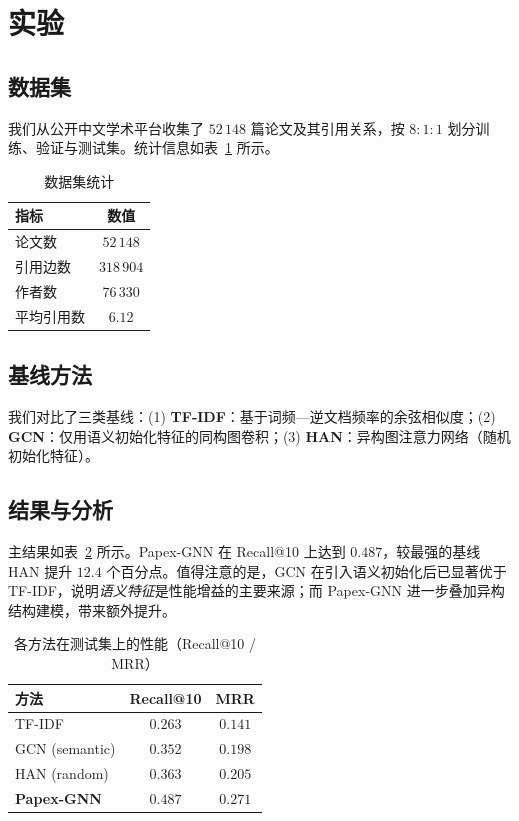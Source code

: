 \section{实验}
\subsection{数据集}
我们从公开中文学术平台收集了 $52\,148$ 篇论文及其引用关系，按 $8{:}1{:}1$ 划分训练、验证与测试集。统计信息如表~\ref{tab:stats} 所示。

\begin{table}[htbp]
  \centering
  \caption{数据集统计}
  \label{tab:stats}
  \begin{tabular}{lc}
    \toprule
    指标 & 数值 \\
    \midrule
    论文数 & $52\,148$ \\
    引用边数 & $318\,904$ \\
    作者数 & $76\,330$ \\
    平均引用数 & $6.12$ \\
    \bottomrule
  \end{tabular}
\end{table}

\subsection{基线方法}
我们对比了三类基线：(1) \textbf{TF-IDF}：基于词频—逆文档频率的余弦相似度；(2) \textbf{GCN}：仅用语义初始化特征的同构图卷积；(3) \textbf{HAN}：异构图注意力网络（随机初始化特征）。

\subsection{结果与分析}
主结果如表~\ref{tab:main} 所示。Papex-GNN 在 Recall@10 上达到 $0.487$，较最强的基线 HAN 提升 $12.4$ 个百分点。值得注意的是，GCN 在引入语义初始化后已显著优于 TF-IDF，说明\emph{语义特征}是性能增益的主要来源；而 Papex-GNN 进一步叠加异构结构建模，带来额外提升。

\begin{table}[htbp]
  \centering
  \caption{各方法在测试集上的性能（Recall@10 / MRR）}
  \label{tab:main}
  \begin{tabular}{lcc}
    \toprule
    方法 & Recall@10 & MRR \\
    \midrule
    TF-IDF            & $0.263$ & $0.141$ \\
    GCN (semantic)    & $0.352$ & $0.198$ \\
    HAN (random)      & $0.363$ & $0.205$ \\
    \textbf{Papex-GNN}& $\mathbf{0.487}$ & $\mathbf{0.271}$ \\
    \bottomrule
  \end{tabular}
\end{table}

